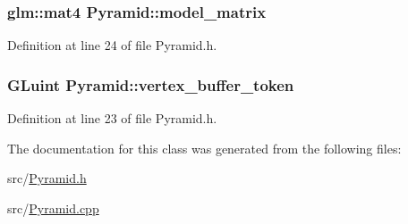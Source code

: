 \subsubsection[{model\+\_\+matrix}]{\setlength{\rightskip}{0pt plus 5cm}glm\+::mat4 Pyramid\+::model\+\_\+matrix\hspace{0.3cm}{\ttfamily [private]}}\label{class_pyramid_a6c97c4bb0dd7e4f12e50edd8dcc1cce9}


Definition at line 24 of file Pyramid.\+h.

\hypertarget{class_pyramid_a8e1f08dc7c85cabe71117b1c9b8ea987}{}
\subsubsection[{vertex\+\_\+buffer\+\_\+token}]{\setlength{\rightskip}{0pt plus 5cm}G\+Luint Pyramid\+::vertex\+\_\+buffer\+\_\+token\hspace{0.3cm}{\ttfamily [private]}}\label{class_pyramid_a8e1f08dc7c85cabe71117b1c9b8ea987}


Definition at line 23 of file Pyramid.\+h.



The documentation for this class was generated from the following files\+:\begin{DoxyCompactItemize}
\item 
src/\hyperlink{_pyramid_8h}{Pyramid.\+h}\item 
src/\hyperlink{_pyramid_8cpp}{Pyramid.\+cpp}\end{DoxyCompactItemize}
